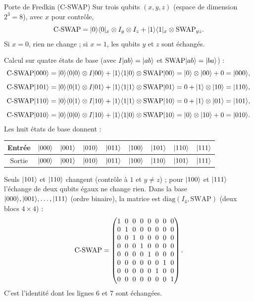 \begin{definition}{Porte de Fredkin (C-SWAP)}
Sur trois qubits $(x,y,z)$ (espace de dimension $2^3=8$), avec $x$ pour contrôle,
\[
  \mathrm{C\text{-}SWAP}=|0\rangle\langle 0|_x\otimes I_y\otimes I_z+|1\rangle\langle 1|_x\otimes\mathrm{SWAP}_{yz}.
\]
Si $x=0$, rien ne change ; si $x=1$, les qubits $y$ et $z$ sont échangés.
\end{definition}

Calcul sur quatre états de base (avec $I|ab\rangle=|ab\rangle$ et $\mathrm{SWAP}|ab\rangle=|ba\rangle$) :
\begin{align*}
  \mathrm{C\text{-}SWAP}|000\rangle&=|0\rangle\langle 0|0\rangle\otimes I|00\rangle+|1\rangle\langle 1|0\rangle\otimes\mathrm{SWAP}|00\rangle
     =|0\rangle\otimes|00\rangle+0=|000\rangle,\\[1.2ex]
  \mathrm{C\text{-}SWAP}|101\rangle&=|0\rangle\langle 0|1\rangle\otimes I|01\rangle+|1\rangle\langle 1|1\rangle\otimes\mathrm{SWAP}|01\rangle
     =0+|1\rangle\otimes|10\rangle=|110\rangle,\\[1.2ex]
  \mathrm{C\text{-}SWAP}|110\rangle&=|0\rangle\langle 0|1\rangle\otimes I|10\rangle+|1\rangle\langle 1|1\rangle\otimes\mathrm{SWAP}|10\rangle
     =0+|1\rangle\otimes|01\rangle=|101\rangle,\\[1.2ex]
  \mathrm{C\text{-}SWAP}|010\rangle&=|0\rangle\langle 0|0\rangle\otimes I|10\rangle+|1\rangle\langle 1|0\rangle\otimes\mathrm{SWAP}|10\rangle
     =|0\rangle\otimes|10\rangle+0=|010\rangle.
\end{align*}
Les huit états de base donnent :
\begin{center}
\renewcommand{\arraystretch}{1.3}
\begin{tabular}{@{}ccccccccc@{}}
\toprule
Entrée & $|000\rangle$ & $|001\rangle$ & $|010\rangle$ & $|011\rangle$ & $|100\rangle$ & $|101\rangle$ & $|110\rangle$ & $|111\rangle$ \\
\midrule
Sortie & $|000\rangle$ & $|001\rangle$ & $|010\rangle$ & $|011\rangle$ & $|100\rangle$ & $|110\rangle$ & $|101\rangle$ & $|111\rangle$ \\
\bottomrule
\end{tabular}
\end{center}
Seuls $|101\rangle$ et $|110\rangle$ changent (contrôle à $1$ et $y\neq z$) ; pour $|100\rangle$ et
$|111\rangle$ l'échange de deux qubits égaux ne change rien. Dans la base
$|000\rangle,|001\rangle,\dots,|111\rangle$ (ordre binaire), la matrice est
$\mathrm{diag}(I_4,\mathrm{SWAP})$ (deux blocs $4\times4$) :
\[
  \mathrm{C\text{-}SWAP}=\begingroup\setlength{\arraycolsep}{3pt}\begin{pmatrix}
    1&0&0&0&0&0&0&0\\
    0&1&0&0&0&0&0&0\\
    0&0&1&0&0&0&0&0\\
    0&0&0&1&0&0&0&0\\
    0&0&0&0&1&0&0&0\\
    0&0&0&0&0&0&1&0\\
    0&0&0&0&0&1&0&0\\
    0&0&0&0&0&0&0&1
  \end{pmatrix}\endgroup .
\]
C'est l'identité dont les lignes $6$ et $7$ sont échangées.

